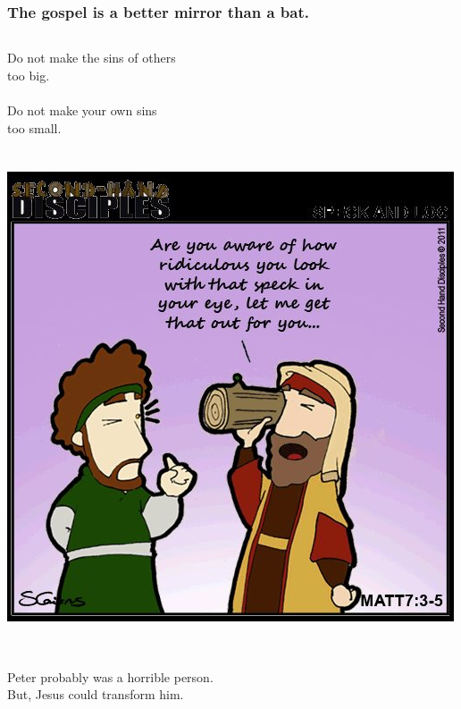 \documentclass{beamer}
\begin{document}
\begin{frame}
\frametitle{The gospel is a better mirror than a bat.}
\begin{columns}
\column{5cm}
Do not make the sins of others\\too big.\\~\\
Do not make your own sins\\too small.\\~\\~\\
\column{5cm}
\includegraphics[width=\textwidth]{graphics/beam.jpg}\\
\end{columns}
~\\Peter probably was a horrible person.\\
But, Jesus could transform him.
\end{frame}
\end{document}
